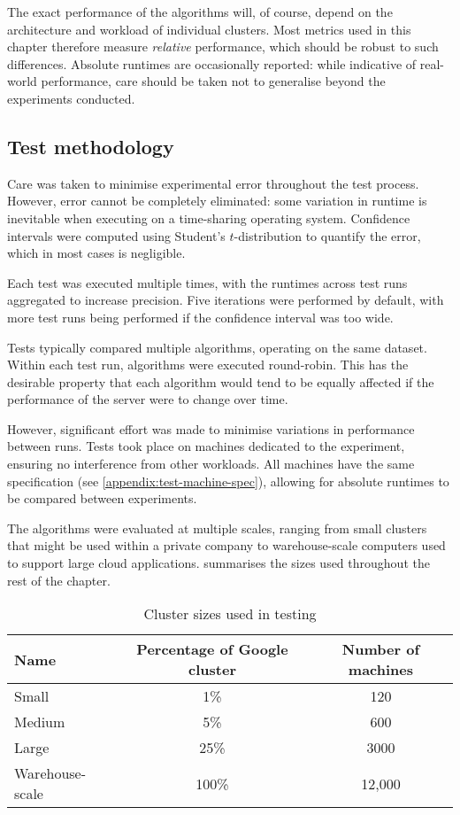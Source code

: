 The exact performance of the algorithms will, of course, depend on the architecture and workload of individual clusters. Most metrics used in this chapter therefore measure \emph{relative} performance, which should be robust to such differences. Absolute runtimes are occasionally reported: while indicative of real-world performance, care should be taken not to generalise beyond the experiments conducted.


\subsection{Test methodology} \label{sec:eval-benchmark-strategy-methodology}

Care was taken to minimise experimental error throughout the test process. However, error cannot be completely eliminated: some variation in runtime is inevitable when executing on a time-sharing operating system. Confidence intervals were computed using Student's $t$-distribution to quantify the error, which in most cases is negligible.

Each test was executed multiple times, with the runtimes across test runs aggregated to increase precision. Five iterations were performed by default, with more test runs being performed if the confidence interval was too wide.

Tests typically compared multiple algorithms, operating on the same dataset. Within each test run, algorithms were executed round-robin. This has the desirable property that each algorithm would tend to be equally affected if the performance of the server were to change over time.

However, significant effort was made to minimise variations in performance between runs. Tests took place on machines dedicated to the experiment, ensuring no interference from other workloads. All machines have the same specification (see \cref{appendix:test-machine-spec}), allowing for absolute runtimes to be compared between experiments.

The algorithms were evaluated at multiple scales, ranging from small clusters that might be used within a private company to warehouse-scale computers used to support large cloud applications.  summarises the sizes used throughout the rest of the chapter.

\begin{table}
    \centering
    \begin{tabular}{lcc}
        \textbf{Name} & \textbf{Percentage of Google cluster} & \textbf{Number of machines} \tabularnewline
        \hline
        Small & 1\% & 120 \tabularnewline
        Medium & 5\% & 600 \tabularnewline
        Large & 25\% & 3000 \tabularnewline 
        Warehouse-scale & 100\% & 12,000 \tabularnewline
    \end{tabular}
    \caption{Cluster sizes used in testing}
    \label{table:cluster-sizes}
\end{table}

